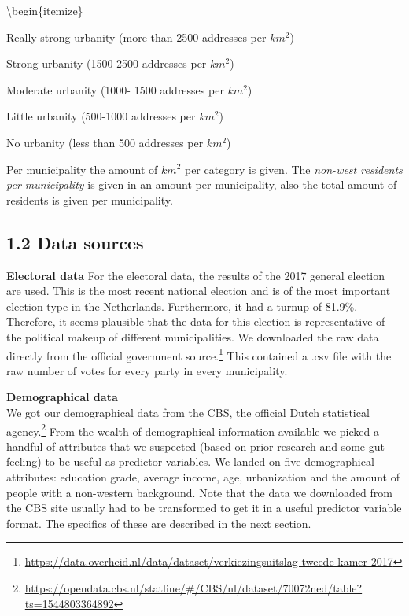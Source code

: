 \documentclass[11pt,]{article}
\let\rmarkdownfootnote\footnote%
\def\footnote{\protect\rmarkdownfootnote}
\begin{document}
\textbackslash{}begin\{itemize\} \item Really strong urbanity (more than
2500 addresses per \(km^2\)) \item Strong urbanity (1500-2500 addresses
per \(km^2\)) \item Moderate urbanity (1000- 1500 addresses per
\(km^2\)) \item Little urbanity (500-1000 addresses per \(km^2\))\\
\item No urbanity (less than 500 addresses per \(km^2\))

Per municipality the amount of \(km^2\) per category is given. The
\emph{non-west residents per municipality} is given in an amount per
municipality, also the total amount of residents is given per
municipality.

\subsection{1.2 Data sources}\label{data-sources}

\textbf{Electoral data} For the electoral data, the results of the 2017
general election are used. This is the most recent national election and
is of the most important election type in the Netherlands. Furthermore,
it had a turnup of 81.9\%. Therefore, it seems plausible that the data
for this election is representative of the political makeup of different
municipalities. We downloaded the raw data directly from the official
government source.\footnote{\url{https://data.overheid.nl/data/dataset/verkiezingsuitslag-tweede-kamer-2017}}
This contained a .csv file with the raw number of votes for every party
in every municipality.

\textbf{Demographical data}\\
We got our demographical data from the CBS, the official Dutch
statistical agency.\footnote{\url{https://opendata.cbs.nl/statline/\#/CBS/nl/dataset/70072ned/table?ts=1544803364892}}
From the wealth of demographical information available we picked a
handful of attributes that we suspected (based on prior research and
some gut feeling) to be useful as predictor variables. We landed on five
demographical attributes: education grade, average income, age,
urbanization and the amount of people with a non-western background.
Note that the data we downloaded from the CBS site usually had to be
transformed to get it in a useful predictor variable format. The
specifics of these are described in the next section.
\end{document}
